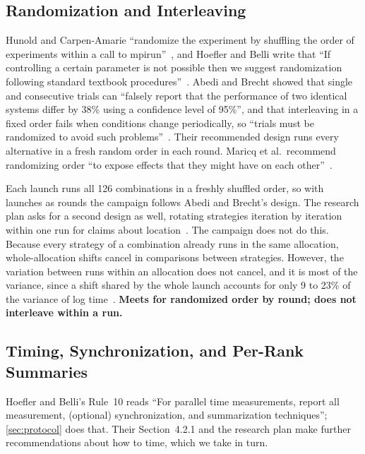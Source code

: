 \documentclass[11pt]{article}
\newcommand{\verdict}[1]{\textbf{#1}}
\begin{document}
\subsection{Randomization and Interleaving}

Hunold and Carpen-Amarie ``randomize the experiment by shuffling the order of
experiments within a call to mpirun''~\cite[Section~5.1]{hunold2016reproducible}, and
Hoefler and Belli write that ``If controlling a certain parameter is not possible then we
suggest randomization following standard textbook
procedures''~\cite{hoefler2015scientific}. Abedi and Brecht showed that single and
consecutive trials can ``falsely report that the performance of two identical systems
differ by 38\% using a confidence level of 95\%'', and that interleaving in a fixed order
fails when conditions change periodically, so ``trials must be randomized to avoid such
problems''~\cite{abedi2017conducting}. Their recommended design runs every alternative in
a fresh random order in each round. Maricq et al.\ recommend randomizing order ``to expose
effects that they might have on each other''~\cite{maricq2018taming}.

Each launch runs all 126 combinations in a freshly shuffled order, so with launches as
rounds the campaign follows Abedi and Brecht's design. The research plan asks for a
second design as well, rotating strategies iteration by iteration within one run for
claims about location~\cite{researchplan}. The campaign does not do this. Because every
strategy of a combination already runs in the same allocation, whole-allocation shifts
cancel in comparisons between strategies. However, the variation between runs within an
allocation does not cancel, and it is most of the variance, since a shift shared by the
whole launch accounts for only 9 to 23\% of the variance of log time~\cite{fivewayreport}.
\verdict{Meets for randomized order by round; does not interleave within a run.}

\subsection{Timing, Synchronization, and Per-Rank Summaries}

Hoefler and Belli's Rule~10 reads ``For parallel time measurements, report all
measurement, (optional) synchronization, and summarization techniques'';
\cref{sec:protocol} does that. Their Section~4.2.1 and the research plan make further
recommendations about how to time, which we take in turn.
\end{document}
